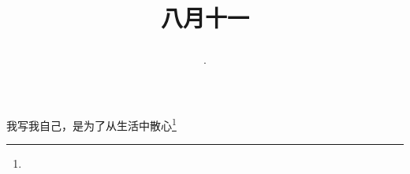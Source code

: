 \title{\date[d=13,m=9,y=2024][year:cn-y,年,month:cn,day:cn,日,·,weekday]·八月十一 }
我写我自己，是为了从生活中散心\footnote{ }

